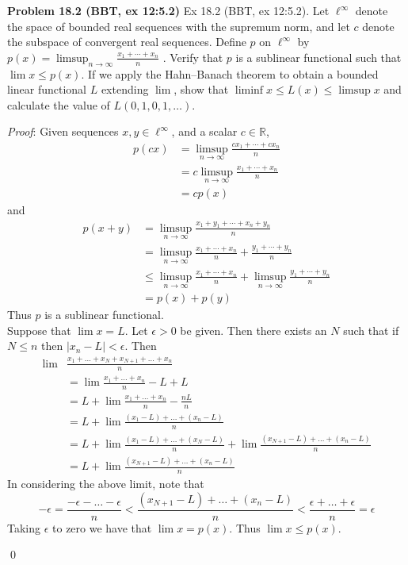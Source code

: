 \documentclass[12pt]{article}
\newcommand{\problem}[1]{\hspace{-4 ex} \large \textbf{Problem #1} }
\renewenvironment{proof}{\hspace{-4 ex} \emph{Proof}:}{\qed}
\newcommand{\RR}{\mathbb{R}}
\begin{document}
\problem{18.2 (BBT, ex 12:5.2)}
Ex 18.2 (BBT, ex 12:5.2). Let $\ell^\infty$ denote the space of bounded real sequences with the supremum norm, and let $c$ denote the subspace of convergent real sequences. Define $p$ on $\ell^\infty$ by
$p(x)=\limsup_{n\to\infty}\frac{x_1+\cdots+x_n}{n}$ .
Verify that $p$ is a sublinear functional such that $\lim x\leq p(x)$. If we apply the Hahn--Banach theorem to obtain a bounded linear functional $L$ extending $\lim$, show that $\liminf x\leq L(x)\leq\limsup x$ and calculate the value of $L(0,1,0,1,\ldots)$.

	\begin{proof}
		Given sequences $x,y \in \ell^\infty$, and a scalar $c \in \RR$, 
		\begin{align*}
			p(cx) & = \limsup_{n\to\infty}\frac{cx_1+\cdots+cx_n}{n} \\
			& = c \limsup_{n\to\infty}\frac{x_1+\cdots+x_n}{n} \\
			& = cp(x)
		\end{align*}
		and
		\begin{align*}
			p(x+y) & = \limsup_{n\to\infty}\frac{x_1+y_1+\cdots+x_n+y_n}{n} \\
			& = \limsup_{n\to\infty}\frac{x_1+\cdots+x_n}{n} + \frac{y_1+\cdots+y_n}{n}\\
			& \leq \limsup_{n\to\infty}\frac{x_1+\cdots+x_n}{n} + \limsup_{n\to\infty} \frac{y_1+\cdots+y_n}{n}\\
			& = p(x) + p(y)
		\end{align*}
		Thus $p$ is a sublinear functional. \\
		Suppose that $\lim x = L$. Let $\epsilon > 0$ be given. Then there exists an $N$ such that if $N \leq n$ then $\vert x_n - L \vert < \epsilon$. Then
		\begin{align*}
			\lim & \frac{x_1 + \dots +x_N + x_{N+1} + \dots + x_n}{n}\\
			& = \lim \frac{x_1 + \dots + x_n}{n} -L +L \\
			& = L + \lim \frac{x_1 + \dots + x_n}{n} -\frac{nL}{n} \\
			& = L + \lim \frac{(x_1-L) + \dots  + (x_n-L)}{n} \\
			& = L + \lim \frac{(x_1-L) + \dots + (x_N-L)}{n} + \lim \frac{(x_{N+1}-L) + \dots + (x_n-L)}{n} \\
			& = L + \lim \frac{(x_{N+1}-L) + \dots + (x_n-L)}{n}
		\end{align*}
		In considering the above limit, note that
		$$
		-\epsilon = \frac{ -\epsilon - \dots	- \epsilon}{n} < \frac{(x_{N+1}-L) + \dots + (x_n-L)}{n} < \frac{ \epsilon + \dots	+ \epsilon}{n} = \epsilon
		$$
		Taking $\epsilon$ to zero we have that $\lim x = p(x)$. Thus $\lim x \leq p(x)$. \bigbreak
		

\end{proof}
\end{document}
